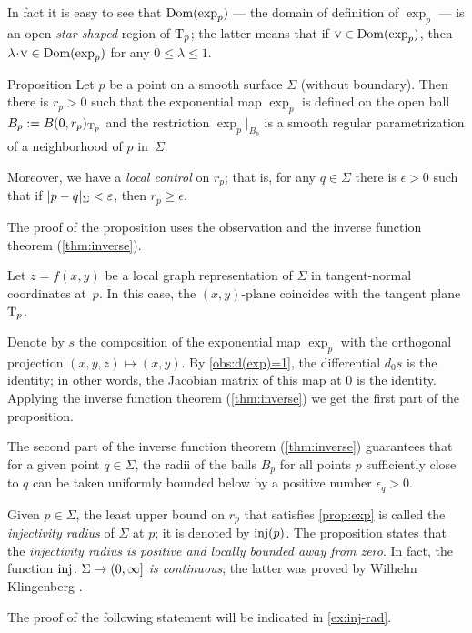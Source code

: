 In fact it is easy to see that $\mathop{\rm Dom}\nolimits(\exp_p)$ --- the domain of definition of $\exp_p$ --- is an open \emph{star-shaped} region of $\mathrm{T}_p$;
the latter means that if $\text{\sc{v}}\in \mathop{\rm Dom}\nolimits(\exp_p)$, then $\lambda\cdot\vec v\in \Dom(\exp_p)$ for any $0\le \lambda\le 1$.


\begin{thm}{Proposition}\label{prop:exp}
Let $p$ be a point on a smooth surface $\Sigma$ (without boundary).
Then there is $r_p>0$ such that
the exponential map $\exp_p$ is defined on the open ball $B_p\mathrel{:=} B(0,r_p)_{\mathrm{T}_p}$
and the restriction $\exp_p|_{B_p}$ is a smooth regular parametrization of a neighborhood of $p$ in~$\Sigma$.

Moreover, we have a {}\emph{local control} on $r_p$;
that is, for any $q\in \Sigma$ there is $\epsilon>0$ such that if $\dist{p}{q}\Sigma<\epsilon$, then $r_p\ge\epsilon$.
\end{thm}

The proof of the proposition uses the observation and the inverse function theorem (\ref{thm:inverse}).

Let $z=f(x,y)$ be a local graph representation of $\Sigma$ in tangent-normal coordinates at~$p$.
In this case, the $(x,y)$-plane coincides with the tangent plane $\mathrm{T}_p$.

Denote by $s$ the composition of the exponential map $\exp_p$ with the orthogonal projection $(x,y,z)\mapsto (x,y)$.
By \ref{obs:d(exp)=1}, the differential $d_0s$ is the identity;
in other words, the Jacobian matrix of this map at $0$ is the identity.
Applying the inverse function theorem (\ref{thm:inverse}) we get the first part of the proposition.

The second part of the inverse function theorem (\ref{thm:inverse}) 
 guarantees that for a given point $q\in \Sigma$, the radii of the balls $B_p$
 for all points $p$ sufficiently close to $q$
 can be taken uniformly 
 bounded below by a positive number $\epsilon_q >0$.
\qeds

Given $p\in \Sigma$, the least upper bound on $r_p$ that satisfies \ref{prop:exp} is called the \emph{injectivity radius} of $\Sigma$ at $p$;
it is denoted by $\mathop{\rm inj}\nolimits(p)$.
The proposition states that the {}\emph{injectivity radius is positive and locally bounded away from zero}.
In fact, the function {}\emph{$\mathop{\rm inj}\nolimits\colon\Sigma\to (0,\infty]$ is continuous};
the latter was proved by Wilhelm Klingenberg \cite[5.4]{gromoll-klingenberg-meyer}. 

The proof of the following statement will be indicated in \ref{ex:inj-rad}.

